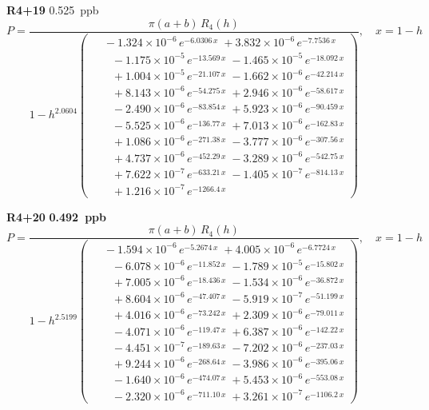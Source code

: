 \documentclass[12pt]{article}
\begin{document}
\noindent\textbf{R4+19} 0.525~ppb\nopagebreak
\begin{equation*}
P = \frac{\pi(a{+}b)\,R_4(h)}{1 - h^{2.0604}\!\left(\!\begin{aligned}
  &\; -1.324{\times}10^{-6}\,e^{-6.0306\,x} \; +3.832{\times}10^{-6}\,e^{-7.7536\,x} \\[-3pt]
  &\quad -1.175{\times}10^{-5}\,e^{-13.569\,x} \; -1.465{\times}10^{-5}\,e^{-18.092\,x} \\[-3pt]
  &\quad +1.004{\times}10^{-5}\,e^{-21.107\,x} \; -1.662{\times}10^{-6}\,e^{-42.214\,x} \\[-3pt]
  &\quad +8.143{\times}10^{-6}\,e^{-54.275\,x} \; +2.946{\times}10^{-6}\,e^{-58.617\,x} \\[-3pt]
  &\quad -2.490{\times}10^{-6}\,e^{-83.854\,x} \; +5.923{\times}10^{-6}\,e^{-90.459\,x} \\[-3pt]
  &\quad -5.525{\times}10^{-6}\,e^{-136.77\,x} \; +7.013{\times}10^{-6}\,e^{-162.83\,x} \\[-3pt]
  &\quad +1.086{\times}10^{-6}\,e^{-271.38\,x} \; -3.777{\times}10^{-6}\,e^{-307.56\,x} \\[-3pt]
  &\quad +4.737{\times}10^{-6}\,e^{-452.29\,x} \; -3.289{\times}10^{-6}\,e^{-542.75\,x} \\[-3pt]
  &\quad +7.622{\times}10^{-7}\,e^{-633.21\,x} \; -1.405{\times}10^{-7}\,e^{-814.13\,x} \\[-3pt]
  &\quad +1.216{\times}10^{-7}\,e^{-1266.4\,x}
\end{aligned}\!\right)}, \quad x = 1{-}h
\end{equation*}

\noindent\textbf{R4+20} \textbf{0.492~ppb}\nopagebreak
\begin{equation*}
P = \frac{\pi(a{+}b)\,R_4(h)}{1 - h^{2.5199}\!\left(\!\begin{aligned}
  &\; -1.594{\times}10^{-6}\,e^{-5.2674\,x} \; +4.005{\times}10^{-6}\,e^{-6.7724\,x} \\[-3pt]
  &\quad -6.078{\times}10^{-6}\,e^{-11.852\,x} \; -1.789{\times}10^{-5}\,e^{-15.802\,x} \\[-3pt]
  &\quad +7.005{\times}10^{-6}\,e^{-18.436\,x} \; -1.534{\times}10^{-6}\,e^{-36.872\,x} \\[-3pt]
  &\quad +8.604{\times}10^{-6}\,e^{-47.407\,x} \; -5.919{\times}10^{-7}\,e^{-51.199\,x} \\[-3pt]
  &\quad +4.016{\times}10^{-6}\,e^{-73.242\,x} \; +2.309{\times}10^{-6}\,e^{-79.011\,x} \\[-3pt]
  &\quad -4.071{\times}10^{-6}\,e^{-119.47\,x} \; +6.387{\times}10^{-6}\,e^{-142.22\,x} \\[-3pt]
  &\quad -4.451{\times}10^{-7}\,e^{-189.63\,x} \; -7.202{\times}10^{-6}\,e^{-237.03\,x} \\[-3pt]
  &\quad +9.244{\times}10^{-6}\,e^{-268.64\,x} \; -3.986{\times}10^{-6}\,e^{-395.06\,x} \\[-3pt]
  &\quad -1.640{\times}10^{-6}\,e^{-474.07\,x} \; +5.453{\times}10^{-6}\,e^{-553.08\,x} \\[-3pt]
  &\quad -2.320{\times}10^{-6}\,e^{-711.10\,x} \; +3.261{\times}10^{-7}\,e^{-1106.2\,x}
\end{aligned}\!\right)}, \quad x = 1{-}h
\end{equation*}
\end{document}

